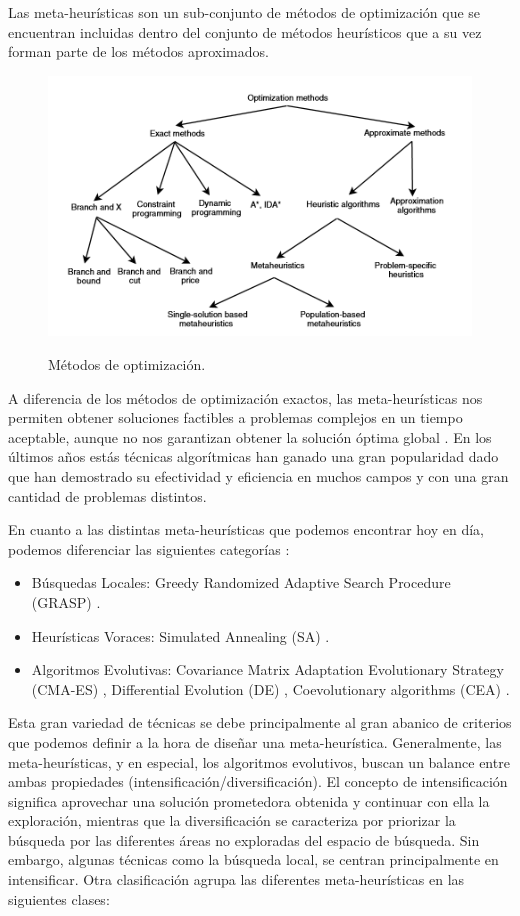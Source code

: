 Las meta-heurísticas son un sub-conjunto de métodos de optimización que se encuentran incluidas dentro del conjunto de métodos heurísticos que a su vez forman parte de los métodos aproximados.

\begin{figure}
  \centering
\includegraphics[scale=1.0]{images/meta}\\[10mm]
  \caption{Métodos de optimización.}
\end{figure}

A diferencia de los métodos de optimización exactos, las meta-heurísticas nos permiten obtener soluciones factibles a problemas complejos en un tiempo aceptable, aunque no nos garantizan obtener la solución óptima global \cite{metaheuristics}. En los últimos años estás técnicas algorítmicas han ganado una gran popularidad dado que han demostrado su efectividad y eficiencia en muchos campos y con una gran cantidad de problemas distintos.

En cuanto a las distintas meta-heurísticas que podemos encontrar hoy en día, podemos diferenciar las siguientes categorías \cite{metaheuristics}:

\begin{itemize}
    \item Búsquedas Locales: Greedy Randomized Adaptive Search Procedure (GRASP) \cite{GRASP}.
    \item Heurísticas Voraces: Simulated Annealing (SA) \cite{SA}.
    \item Algoritmos Evolutivas: Covariance Matrix Adaptation Evolutionary Strategy (CMA-ES) \cite{CMA}, Differential Evolution (DE) \cite{DE1, DE2, DE3}, Coevolutionary algorithms (CEA) \cite{COE1, COE2, COE3}.
\end{itemize}


Esta gran variedad de técnicas se debe principalmente al gran abanico de criterios que podemos definir a la hora de diseñar una meta-heurística. Generalmente, las meta-heurísticas, y en especial, los algoritmos evolutivos, buscan un balance entre ambas propiedades (intensificación/diversificación). El concepto de intensificación significa aprovechar una solución prometedora  obtenida y continuar con ella la exploración, mientras que la diversificación se caracteriza por priorizar la búsqueda por las diferentes áreas no exploradas del espacio de búsqueda. Sin embargo, algunas técnicas como la búsqueda local, se centran principalmente en intensificar. Otra clasificación agrupa las diferentes meta-heurísticas en las siguientes clases:

